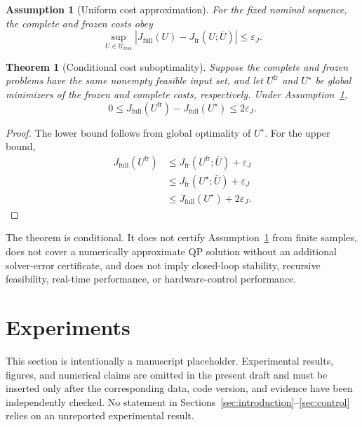 ﻿\documentclass[journal]{IEEEtran}
\newtheorem{assumption}{Assumption}
\newtheorem{theorem}{Theorem}
\begin{document}
\begin{assumption}[Uniform cost approximation]
\label{ass:cost_approximation}
For the fixed nominal sequence, the complete and frozen costs obey
\begin{equation}
    \sup_{U\in\mathcal U_{\mathrm{feas}}}
    |J_{\mathrm{full}}(U)-J_{\mathrm{fr}}(U;\bar U)|\le\varepsilon_J.
\end{equation}
\end{assumption}

\begin{theorem}[Conditional cost suboptimality]
\label{thm:suboptimality}
Suppose the complete and frozen problems have the same nonempty feasible input set, and let $U^{\mathrm{fr}}$ and $U^\star$ be global minimizers of the frozen and complete costs, respectively. Under Assumption~\ref{ass:cost_approximation},
\begin{equation}
    0\le J_{\mathrm{full}}(U^{\mathrm{fr}})-J_{\mathrm{full}}(U^\star)
    \le2\varepsilon_J.
    \label{eq:suboptimality_bound}
\end{equation}
\end{theorem}
\begin{proof}
The lower bound follows from global optimality of $U^\star$. For the upper bound,
\begin{align*}
J_{\mathrm{full}}(U^{\mathrm{fr}})
&\le J_{\mathrm{fr}}(U^{\mathrm{fr}};\bar U)+\varepsilon_J\\
&\le J_{\mathrm{fr}}(U^\star;\bar U)+\varepsilon_J\\
&\le J_{\mathrm{full}}(U^\star)+2\varepsilon_J.
\end{align*}
\end{proof}

The theorem is conditional. It does not certify Assumption~\ref{ass:cost_approximation} from finite samples, does not cover a numerically approximate QP solution without an additional solver-error certificate, and does not imply closed-loop stability, recursive feasibility, real-time performance, or hardware-control performance.

\section{Experiments}
\label{sec:experiments}

This section is intentionally a manuscript placeholder. Experimental results, figures, and numerical claims are omitted in the present draft and must be inserted only after the corresponding data, code version, and evidence have been independently checked. No statement in Sections~\ref{sec:introduction}--\ref{sec:control} relies on an unreported experimental result.
\end{document}
